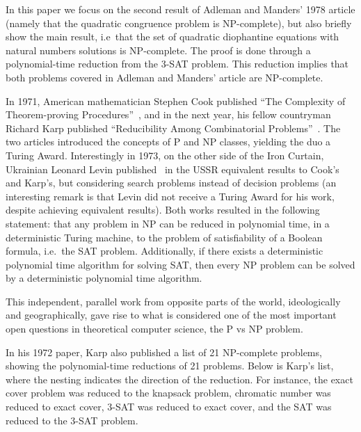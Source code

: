 \documentclass{amsart}
\theoremstyle{plain}
\begin{document}
In this paper we focus on the second result of Adleman and Manders' 1978 article (namely that the
quadratic congruence problem is NP-complete), but also briefly show the main result, i.e\ that
the set of quadratic diophantine equations with natural numbers solutions is NP-complete. The proof
is done through a polynomial-time reduction from the 3-SAT problem. This reduction implies that
both problems covered in Adleman and Manders' article are NP-complete.

In 1971, American mathematician Stephen Cook published ``The Complexity of Theorem-proving
Procedures''~\cite{cook}, and in the next year, his fellow countryman Richard Karp published
``Reducibility Among Combinatorial Problems''~\cite{karp}. The two articles introduced the concepts
of P and NP classes, yielding the duo a Turing Award. Interestingly in 1973, on the other side of
the Iron Curtain, Ukrainian Leonard Levin published~\cite{levin} in the USSR equivalent results to
Cook's and Karp's, but considering search problems instead of decision problems (an interesting
remark is that Levin did not receive a Turing Award for his work, despite achieving equivalent
results). Both works resulted in the following statement: that any problem in NP can be reduced in
polynomial time, in a deterministic Turing machine, to the problem of satisfiability of a Boolean
formula, i.e.\ the SAT problem.  Additionally, if there exists a deterministic polynomial time
algorithm for solving SAT, then every NP problem can be solved by a deterministic polynomial time
algorithm.

This independent, parallel work from opposite parts of the world, ideologically and geographically,
gave rise to what is considered one of the most important open questions in theoretical computer
science, the P vs NP problem.

In his 1972 paper, Karp also published a list of 21 NP-complete problems, showing the
polynomial-time reductions of 21 problems. Below is Karp's list, where the nesting indicates the
direction of the reduction. For instance, the exact cover problem was reduced to the knapsack
problem, chromatic number was reduced to exact cover, 3-SAT was reduced to exact cover, and the SAT
was reduced to the 3-SAT problem.
\end{document}
